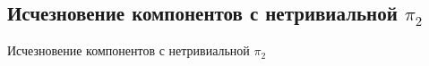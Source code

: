 \subsection{\texorpdfstring{Исчезновение компонентов с нетривиальной ${\pi}_{2}$}{Исчезновение компонентов с нетривиальной π2}}
Исчезновение компонентов с нетривиальной ${\pi}_{2}$